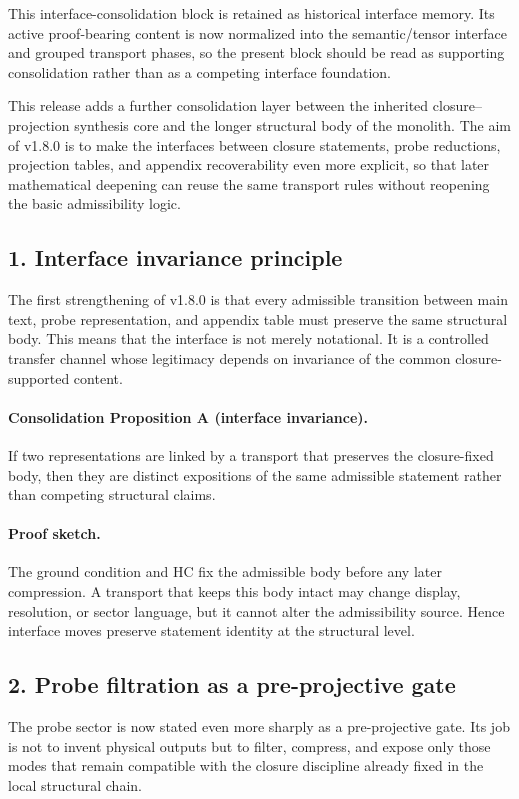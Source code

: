 \begin{remark}
\label{rem:normalization-note-v180}
This interface-consolidation block is retained as historical interface memory. Its active proof-bearing content is now normalized into the semantic/tensor interface and grouped transport phases, so the present block should be read as supporting consolidation rather than as a competing interface foundation.
\end{remark}

This release adds a further consolidation layer between the inherited closure--projection
synthesis core and the longer structural body of the monolith. The aim of
v1.8.0 is to make the interfaces between closure statements, probe reductions,
projection tables, and appendix recoverability even more explicit, so that later
mathematical deepening can reuse the same transport rules without reopening the
basic admissibility logic.

\subsection*{1. Interface invariance principle}
The first strengthening of v1.8.0 is that every admissible transition between
main text, probe representation, and appendix table must preserve the same
structural body. This means that the interface is not merely notational. It is a
controlled transfer channel whose legitimacy depends on invariance of the common
closure-supported content.

\paragraph{Consolidation Proposition A (interface invariance).}
If two representations are linked by a transport that preserves the closure-fixed
body, then they are distinct expositions of the same admissible statement rather
than competing structural claims.

\paragraph{Proof sketch.}
The ground condition and HC fix the admissible body before any later compression.
A transport that keeps this body intact may change display, resolution, or
sector language, but it cannot alter the admissibility source. Hence interface
moves preserve statement identity at the structural level.

\subsection*{2. Probe filtration as a pre-projective gate}
The probe sector is now stated even more sharply as a pre-projective gate. Its
job is not to invent physical outputs but to filter, compress, and expose only
those modes that remain compatible with the closure discipline already fixed in
the local structural chain.

